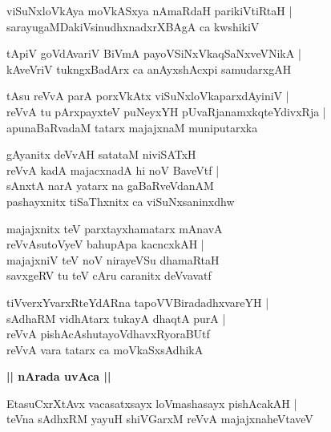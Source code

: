 \documentclass[twoside,12pt,openright]{book}
\newcounter{shloka}[chapter]
\def\uvaca#1{\centerline{{\large\textbf{#1}}}}
\begin{document}
\begin{shloka}
viSuNxloVkAya moVkASxya nAmaRdaH parikiVtiRtaH |\\
sarayugaMDakiVsinudhxnadxrXBAgA ca kwshikiV 
\end{shloka}

\begin{shloka}
tApiV goVdAvariV BiVmA payoVSiNxVkaqSaNxveVNikA |\\
kAveVriV tukngxBadArx ca anAyxshAcxpi samudarxgAH 
\end{shloka}

\begin{shloka}
tAsu reVvA parA porxVkAtx viSuNxloVkaparxdAyiniV |\\
reVvA tu pArxpayxteV puNeyxYH pUvaRjanamxkqteYdivxRja |\\
apunaBaRvadaM tatarx majajxnaM muniputarxka
\end{shloka}


\begin{shloka}
gAyanitx deVvAH satataM niviSATxH \\
reVvA kadA majacxnadA hi noV BaveVtf |\\
sAnxtA narA yatarx na gaBaRveVdanAM \\
pashayxnitx tiSaThxnitx ca viSuNxsaninxdhw
\end{shloka}

\begin{shloka}
majajxnitx teV parxtayxhamatarx mAnavA \\
reVvAsutoVyeV bahupApa kacncxkAH |\\
majajxniV teV noV nirayeVSu dhamaRtaH \\
savxgeRV tu teV cAru caranitx deVvavatf
\end{shloka}

\begin{shloka}
tiVverxYvarxRteYdARna tapoVVBiradadhxvareYH |\\
sAdhaRM vidhAtarx tukayA dhaqtA purA |\\
reVvA pishAcAshutayoVdhavxRyoraBUtf \\
reVvA vara tatarx ca moVkaSxsAdhikA
\end{shloka}

\uvaca{|| nArada uvAca ||}

\begin{shloka}
EtasuCxrXtAvx vacasatxsayx loVmashasayx pishAcakAH |\\
teVna sAdhxRM yayuH shiVGarxM reVvA majajxnaheVtaveV 
\end{shloka}
\end{document}
